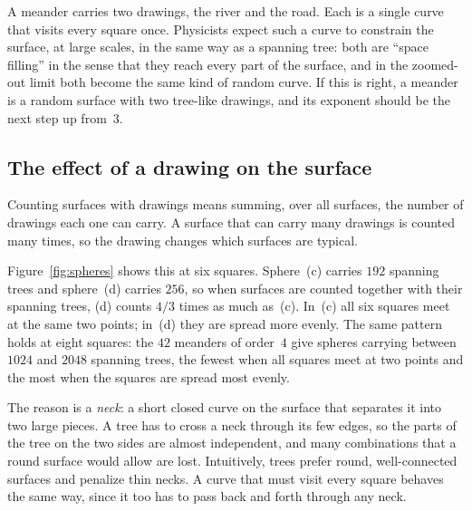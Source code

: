 A meander carries two drawings, the river and the road. Each is a single curve that visits
every square once. Physicists expect such a curve to constrain the surface, at large scales, in
the same way as a spanning tree: both are ``space filling'' in the sense that they reach every
part of the surface, and in the zoomed-out limit both become the same kind of random curve. If
this is right, a meander is a random surface with two tree-like drawings, and its exponent
should be the next step up from~$3$.

\subsection{The effect of a drawing on the surface}\label{sec:charge}

Counting surfaces with drawings means summing, over all surfaces, the number of drawings each
one can carry. A surface that can carry many drawings is counted many times, so the drawing
changes which surfaces are typical.

Figure~\ref{fig:spheres} shows this at six squares. Sphere~(c) carries $192$ spanning trees and
sphere~(d) carries $256$, so when surfaces are counted together with their spanning trees, (d)
counts $4/3$ times as much as~(c). In~(c) all six squares meet at the same two points; in~(d)
they are spread more evenly. The same pattern holds at eight squares: the $42$ meanders of
order~$4$ give spheres carrying between $1024$ and $2048$ spanning trees, the fewest when all
squares meet at two points and the most when the squares are spread most evenly.

The reason is a \emph{neck}: a short closed curve on the surface that separates it into two large
pieces. A tree has to cross a neck through its few edges, so the parts of the tree on the two
sides are almost independent, and many combinations that a round surface would allow are lost.
Intuitively, trees prefer round, well-connected surfaces and penalize thin necks. A curve that
must visit every square behaves the same way, since it too has to pass back and forth through any
neck.

